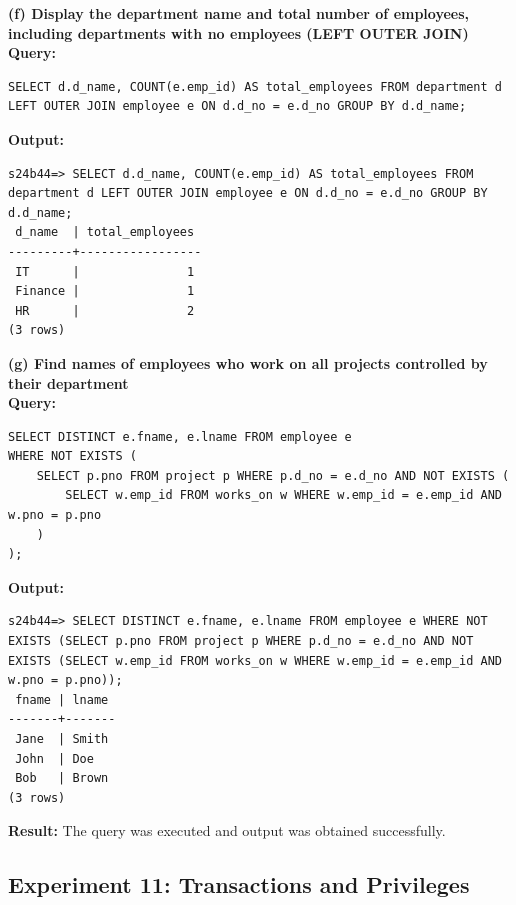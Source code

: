 \documentclass[12pt, a4paper]{article}
\begin{document}
\textbf{(f) Display the department name and total number of employees, including departments with no employees (LEFT OUTER JOIN)}\\
\textbf{Query:}
\begin{lstlisting}
SELECT d.d_name, COUNT(e.emp_id) AS total_employees FROM department d
LEFT OUTER JOIN employee e ON d.d_no = e.d_no GROUP BY d.d_name;
\end{lstlisting}
\textbf{Output:}
\begin{lstlisting}[style=terminal]
s24b44=> SELECT d.d_name, COUNT(e.emp_id) AS total_employees FROM department d LEFT OUTER JOIN employee e ON d.d_no = e.d_no GROUP BY d.d_name;
 d_name  | total_employees 
---------+-----------------
 IT      |               1
 Finance |               1
 HR      |               2
(3 rows)
\end{lstlisting}

\textbf{(g) Find names of employees who work on all projects controlled by their department}\\
\textbf{Query:}
\begin{lstlisting}
SELECT DISTINCT e.fname, e.lname FROM employee e
WHERE NOT EXISTS (
    SELECT p.pno FROM project p WHERE p.d_no = e.d_no AND NOT EXISTS (
        SELECT w.emp_id FROM works_on w WHERE w.emp_id = e.emp_id AND w.pno = p.pno
    )
);
\end{lstlisting}
\textbf{Output:}
\begin{lstlisting}[style=terminal]
s24b44=> SELECT DISTINCT e.fname, e.lname FROM employee e WHERE NOT EXISTS (SELECT p.pno FROM project p WHERE p.d_no = e.d_no AND NOT EXISTS (SELECT w.emp_id FROM works_on w WHERE w.emp_id = e.emp_id AND w.pno = p.pno));
 fname | lname 
-------+-------
 Jane  | Smith
 John  | Doe
 Bob   | Brown
(3 rows)
\end{lstlisting}
\textbf{Result:} The query was executed and output was obtained successfully.


\newpage
\subsection*{Experiment 11: Transactions and Privileges}
\end{document}
